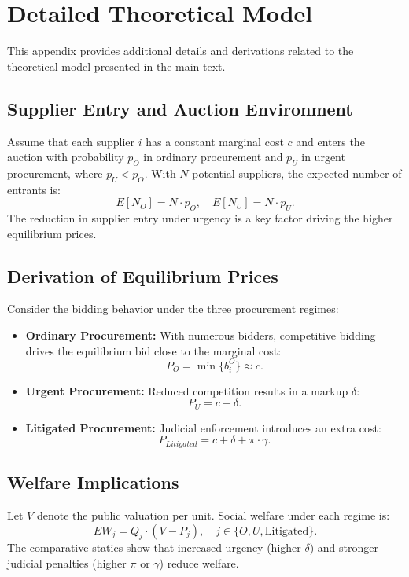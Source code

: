 
\appendix
\section{Detailed Theoretical Model}
This appendix provides additional details and derivations related to the theoretical model presented in the main text.

\subsection{Supplier Entry and Auction Environment}
Assume that each supplier \(i\) has a constant marginal cost \(c\) and enters the auction with probability \(p_O\) in ordinary procurement and \(p_U\) in urgent procurement, where \(p_U < p_O\). With \(N\) potential suppliers, the expected number of entrants is:
\[
E[N_O] = N \cdot p_O, \quad E[N_U] = N \cdot p_U.
\]
The reduction in supplier entry under urgency is a key factor driving the higher equilibrium prices.

\subsection{Derivation of Equilibrium Prices}
Consider the bidding behavior under the three procurement regimes:
\begin{itemize}
    \item \textbf{Ordinary Procurement:} With numerous bidders, competitive bidding drives the equilibrium bid close to the marginal cost:
    \[
    P_O = \min \{b_i^{O}\} \approx c.
    \]
    \item \textbf{Urgent Procurement:} Reduced competition results in a markup \(\delta\):
    \[
    P_U = c + \delta.
    \]
    \item \textbf{Litigated Procurement:} Judicial enforcement introduces an extra cost:
    \[
    P_{Litigated} = c + \delta + \pi \cdot \gamma.
    \]
\end{itemize}

\subsection{Welfare Implications}
Let \(V\) denote the public valuation per unit. Social welfare under each regime is:
\[
EW_j = Q_j \cdot (V - P_j), \quad j \in \{O, U, \text{Litigated}\}.
\]
The comparative statics show that increased urgency (higher \(\delta\)) and stronger judicial penalties (higher \(\pi\) or \(\gamma\)) reduce welfare.

